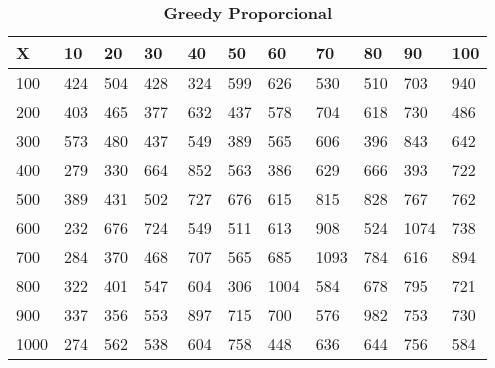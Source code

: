 \documentclass[10pt,letterpaper]{article}
\begin{document}
\begin{center}
\begin{table}\renewcommand{\arraystretch}{2.5}
\caption{\large \textbf{Greedy Proporcional}}
\centering
\begin{tabular} { |m{0.5cm}|m{1.3cm}|m{1.3cm}|m{1.3cm}|m{1.3cm}|m{1.3cm}|m{1.3cm}|m{1.3cm}|m{1.3cm}|m{1.3cm}|m{1.3cm}|} 
\hline
\rowcolor{Gray}
\centering \textbf{X} & \centering \textbf{10} & \centering \textbf{20} & \centering \textbf{30}\ & \centering \textbf{40} & \centering \textbf{50} & \centering \textbf{60}\ & \centering \textbf{70} & \centering \textbf{80} & \centering \textbf{90}\ & \textbf{100} \\\hline
\cellcolor{Gray}100 & \Large 424 & \Large 504 & \Large 428 & \Large 324 & \Large 599 & \Large 626 & \Large 530 & \Large 510 & \Large 703 & \Large 940 \\
\hline
\cellcolor{Gray}200 & \Large 403 & \Large 465 & \Large 377 & \Large 632 & \Large 437 & \Large 578 & \Large 704 & \Large 618 & \Large 730 & \Large 486 \\
\hline
\cellcolor{Gray}300 & \Large 573 & \Large 480 & \Large 437 & \Large 549 & \Large 389 & \Large 565 & \Large 606 & \Large 396 & \Large 843 & \Large 642 \\
\hline
\cellcolor{Gray}400 & \Large 279 & \Large 330 & \Large 664 & \Large 852 & \Large 563 & \Large 386 & \Large 629 & \Large 666 & \Large 393 & \Large 722 \\
\hline
\cellcolor{Gray}500 & \Large 389 & \Large 431 & \Large 502 & \Large 727 & \Large 676 & \Large 615 & \Large 815 & \Large 828 & \Large 767 & \Large 762 \\
\hline
\cellcolor{Gray}600 & \Large 232 & \Large 676 & \Large 724 & \Large 549 & \Large 511 & \Large 613 & \Large 908 & \Large 524 & \Large 1074 & \Large 738 \\
\hline
\cellcolor{Gray}700 & \Large 284 & \Large 370 & \Large 468 & \Large 707 & \Large 565 & \Large 685 & \Large 1093 & \Large 784 & \Large 616 & \Large 894 \\
\hline
\cellcolor{Gray}800 & \Large 322 & \Large 401 & \Large 547 & \Large 604 & \Large 306 & \Large 1004 & \Large 584 & \Large 678 & \Large 795 & \Large 721 \\
\hline
\cellcolor{Gray}900 & \Large 337 & \Large 356 & \Large 553 & \Large 897 & \Large 715 & \Large 700 & \Large 576 & \Large 982 & \Large 753 & \Large 730 \\
\hline
\cellcolor{Gray}1000 & \Large 274 & \Large 562 & \Large 538 & \Large 604 & \Large 758 & \Large 448 & \Large 636 & \Large 644 & \Large 756 & \Large 584 \\
\hline
\end{tabular} \\
\end{table}
\end{center}
\end{document}
